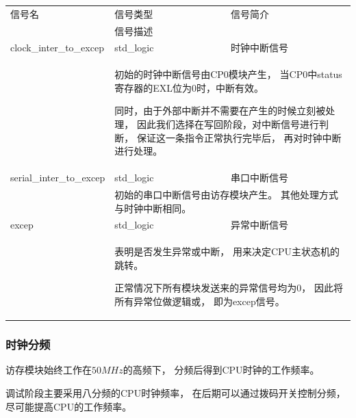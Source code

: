             \begin{tabularx}{\textwidth}{lll}
                \toprule
                信号名          & 信号类型  & 信号简介 \\
                \cmidrule(l){2-3}
                &
                \multicolumn{2}{X}{信号描述} \\
                \midrule
                clock\_inter\_to\_excep   & std\_logic    & 时钟中断信号 \\
                \cmidrule(l){2-3}
                &
                \multicolumn{2}{X}{
                    初始的时钟中断信号由CP0模块产生，
                    当CP0中status寄存器的EXL位为0时，中断有效。

                    同时，由于外部中断并不需要在产生的时候立刻被处理，
                    因此我们选择在写回阶段，对中断信号进行判断，
                    保证这一条指令正常执行完毕后，
                    再对时钟中断进行处理。
                } \\
                \midrule
                serial\_inter\_to\_excep   & std\_logic    & 串口中断信号 \\
                \cmidrule(l){2-3}
                &
                \multicolumn{2}{X}{
                    初始的串口中断信号由访存模块产生。
                    其他处理方式与时钟中断相同。
                } \\
                \midrule
                excep   & std\_logic    & 异常中断信号 \\
                \cmidrule(l){2-3}
                &
                \multicolumn{2}{X}{
                    表明是否发生异常或中断，
                    用来决定CPU主状态机的跳转。

                    正常情况下所有模块发送来的异常信号均为0，
                    因此将所有异常位做逻辑或，
                    即为excep信号。
                } \\
                \bottomrule
            \end{tabularx}

        \subsubsection{时钟分频}
            访存模块始终工作在$50MHz$的高频下，
            分频后得到CPU时钟的工作频率。

            调试阶段主要采用八分频的CPU时钟频率，
            在后期可以通过拨码开关控制分频，
            尽可能提高CPU的工作频率。
